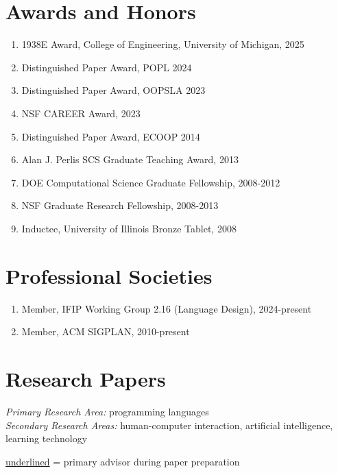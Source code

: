 \documentclass[10pt,letterpaper]{article}
\begin{document}
\section*{Awards and Honors}
\begin{enumerate}
  \item 1938E Award, College of Engineering, University of Michigan, 2025
  \item Distinguished Paper Award, POPL 2024
  \item Distinguished Paper Award, OOPSLA 2023
  \item NSF CAREER Award, 2023
  \item Distinguished Paper Award, ECOOP 2014
  \item {Alan J. Perlis SCS Graduate Teaching Award, 2013}
  \item DOE Computational Science Graduate Fellowship, 2008-2012
  \item NSF Graduate Research Fellowship, 2008-2013
  \item Inductee, University of Illinois Bronze Tablet, 2008
\end{enumerate}

\section*{Professional Societies}
\begin{enumerate}
  \item Member, IFIP Working Group 2.16 (Language Design), 2024-present
  \item Member, ACM SIGPLAN, 2010-present
\end{enumerate}

\section*{Research Papers}

\textit{Primary Research Area:} programming languages \\
\textit{Secondary Research Areas:} human-computer interaction, artificial intelligence, learning technology

\newcommand{\advisee}[1]{\underline{\smash{#1}}}
\underline{underlined} = primary advisor during paper preparation
\end{document}
